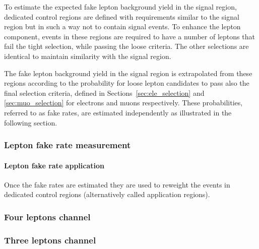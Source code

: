 \label{sec:fake_leptons}
To estimate the expected fake lepton background yield in the signal region,
dedicated control regions are defined with requirements similar to the signal region but in such a way not to contain signal events.
To enhance the \nonprompt lepton component, events in these regions are required to
have a number of leptons that fail the tight selection, while passing the loose criteria.
The other selections are identical to maintain similarity with the signal region.

The fake lepton background yield in the signal region is extrapolated from these regions
according to the probability for loose lepton candidates to pass also the final selection criteria,
defined in Sections~\ref{sec:ele_selection} and \ref{sec:muo_selection} for electrons and muons respectively.
These probabilities, referred to as fake rates, are estimated independently as illustrated in the following section.

\subsubsection{Lepton fake rate measurement}


\paragraph{Lepton fake rate application\\}
Once the fake rates are estimated they are used to reweight the events
in dedicated control regions (alternatively called application regions).

\subsubsection{Four leptons channel}


\subsubsection{Three leptons channel}


